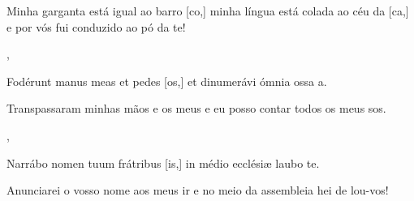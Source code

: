 {    {\item {}Minha garganta está igual ao barro [co,] minha língua está colada ao céu da [ca,] e por vós fui conduzido ao pó da te!~\Responsorium},
  {\item {}Fodérunt manus meas et pedes [os,] et dinumerávi ómnia ossa a.~\Responsorium}%
    {\item {}Transpassaram minhas mãos e os meus  e eu posso contar todos os meus sos.~\Responsorium},
  {\item {}Narrábo nomen tuum frátribus [is,] in médio ecclésiæ laubo te.~\Responsorium}%
    {\item {}Anunciarei o vosso nome aos meus ir e no meio da assembleia hei de lou-vos!~\Responsorium}
}